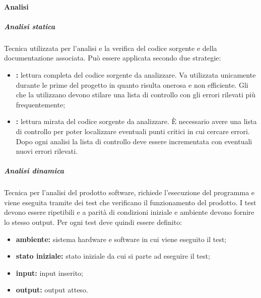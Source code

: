             \paragraph{Analisi}
                \subparagraph{Analisi statica}
                Tecnica utilizzata per l'analisi e la verifica del codice sorgente e della documentazione associata. Può essere applicata secondo due strategie:
                \begin{itemize}
                    \item \textbf{:} lettura completa del codice sorgente da analizzare. Va utilizzata unicamente durante le prime  del progetto in quanto risulta onerosa e non efficiente. Gli \analisti{} che la utilizzano devono stilare una lista di controllo con gli errori rilevati più frequentemente;
                    \item \textbf{:} lettura mirata del codice sorgente da analizzare. È necessario avere una lista di controllo per poter localizzare eventuali punti critici in cui cercare errori. Dopo ogni analisi la lista di controllo deve essere incrementata con eventuali nuovi errori rilevati.
                \end{itemize}
                \subparagraph{Analisi dinamica}
                Tecnica per l'analisi del prodotto software, richiede l'esecuzione del programma e viene eseguita tramite dei test che verificano il funzionamento del prodotto. I test devono essere ripetibili e a parità di condizioni iniziale e ambiente devono fornire lo stesso output. Per ogni test deve quindi essere definito:
                \begin{itemize}
                    \item \textbf{ambiente:} sistema hardware e software in cui viene eseguito il test;
                    \item \textbf{stato iniziale:} stato iniziale da cui si parte ad eseguire il test;
                    \item \textbf{input:} input inserito;
                    \item \textbf{output:} output atteso.
                \end{itemize}
